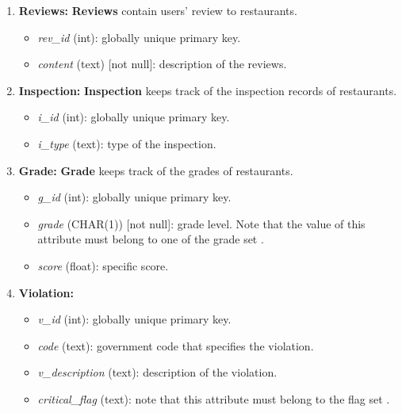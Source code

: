 \documentclass[a4paper,12pt]{article}
\theoremstyle{definition}
\begin{document}
\begin{enumerate}
    \item \textbf{Reviews:} \textbf{Reviews} contain users' review to restaurants.
    \begin{itemize}
        \item \textit{rev\_id} (int): globally unique primary key.
        \item \textit{content} (text) [not null]: description of the reviews. 
    \end{itemize}
    
    \item \textbf{Inspection:} \textbf{Inspection} keeps track of the inspection records of restaurants.
     \begin{itemize}
        \item \textit{i\_id} (int): globally unique primary key.
        \item \textit{i\_type} (text): type of the inspection.
    \end{itemize}
    \item \textbf{Grade:} \textbf{Grade} keeps track of the grades of restaurants.
    \begin{itemize}
        \item \textit{g\_id} (int): globally unique primary key.
        \item \textit{grade} (CHAR(1)) [not null]: grade level. Note that the value of this attribute must belong to one of the grade set \footnotemark[1].
        \item \textit{score} (float): specific score.
    \end{itemize}
    \item \textbf{Violation:}
    \begin{itemize}
        \item \textit{v\_id} (int): globally unique primary key.
        \item \textit{code} (text): government code that specifies the violation.
        \item \textit{v\_description} (text): description of the violation.
        \item \textit{critical\_flag} (text): note that this attribute must belong to the flag set \footnotemark[2].
    \end{itemize} 
\end{enumerate}
\end{document}
